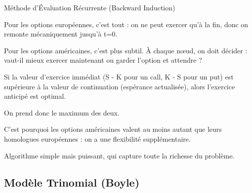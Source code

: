 \documentclass[aspectratio=169, 10pt]{beamer}
\begin{document}
\begin{frame}{Méthode d'Évaluation Récurrente (Backward Induction)}
{        Pour les options européennes, c'est tout : on ne peut exercer qu'à la fin,
        donc on remonte mécaniquement jusqu'à t=0.
        
        Pour les options américaines, c'est plus subtil.
        À chaque nœud, on doit décider : vaut-il mieux exercer maintenant
        ou garder l'option et attendre ?
        
        Si la valeur d'exercice immédiat (S - K pour un call, K - S pour un put)
        est supérieure à la valeur de continuation (espérance actualisée),
        alors l'exercice anticipé est optimal.
        
        On prend donc le maximum des deux.
        
        C'est pourquoi les options américaines valent au moins autant
        que leurs homologues européennes : on a une flexibilité supplémentaire.
        
        Algorithme simple mais puissant, qui capture toute la richesse du problème.
    }
\end{frame}

\subsection{Modèle Trinomial (Boyle)}
\end{document}
